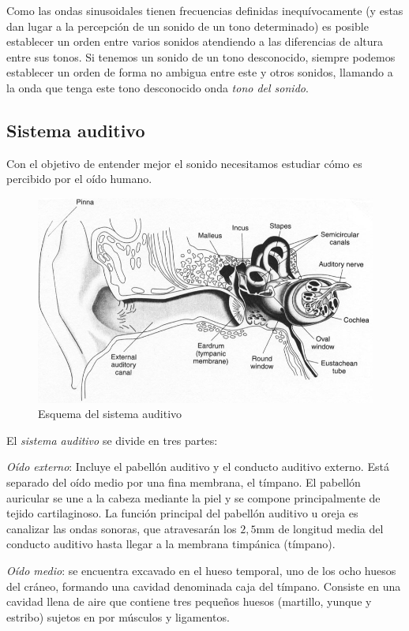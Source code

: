\documentclass[11pt,a4paper]{article}
\begin{document}
		Como las ondas sinusoidales tienen frecuencias definidas inequívocamente (y estas dan lugar a la percepción de un sonido de un tono determinado) es posible establecer un orden entre varios sonidos atendiendo a las diferencias de altura entre sus tonos. Si tenemos un sonido de un tono desconocido, siempre podemos establecer un orden de forma no ambigua entre este y otros sonidos, llamando a la onda que tenga este tono desconocido onda \emph{tono del sonido}.		
				
	\subsection{Sistema auditivo}
	
	Con el objetivo de entender mejor el sonido necesitamos estudiar cómo es percibido por el oído humano.
	
	\begin{figure}[h]
		\centering
		\includegraphics[scale=.3]{AuditorySystem.jpg} 
		\caption{Esquema del sistema auditivo}
	\end{figure}
	
	El  \emph{sistema auditivo} se divide en tres partes: 
	
	\emph{Oído externo}: Incluye el pabellón auditivo y el conducto auditivo externo. Está separado del oído medio por una fina membrana, el tímpano. El pabellón auricular se une a la cabeza mediante la piel y se compone principalmente de tejido cartilaginoso. La función principal del pabellón auditivo u oreja es canalizar las ondas sonoras, que atravesarán los $2,5 $mm de longitud media del conducto auditivo hasta llegar a la membrana timpánica (tímpano).
	
	\emph{Oído medio}: se encuentra excavado en el hueso temporal, uno de los ocho huesos del cráneo, formando una cavidad denominada caja del tímpano. Consiste en una cavidad llena de aire que contiene tres pequeños huesos (martillo, yunque y estribo) sujetos en por músculos y ligamentos. 	
	
\end{document}
